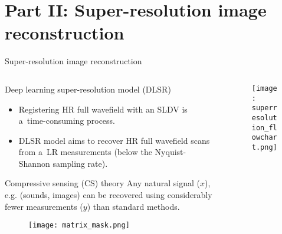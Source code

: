 \documentclass[10pt,aspectratio=169,dvipsnames]{beamer} %
\begin{document}
	\section{Part II: Super-resolution image reconstruction}
	\begin{frame}{Super-resolution image reconstruction}
		\begin{columns}[T]
			\begin{column}[t]{0.6\textwidth}
				\begin{alertblock}{Deep learning super-resolution model (DLSR)}					
					\begin{footnotesize}
						\justifying
						\addtolength{\leftmargini}{\labelsep}
						\begin{itemize}
							\item Registering HR full wavefield with an SLDV is a~time-consuming process.
							\item DLSR model aims to recover HR full wavefield scans from a~LR measurements (below the Nyquist-Shannon sampling rate).
						\end{itemize} 
					\end{footnotesize}					
				\end{alertblock}						
				\begin{exampleblock}{Compressive sensing (CS) theory}
					\footnotesize
					\justifying
					Any natural signal (\(x\)), e.g. (sounds, images) can be recovered using considerably fewer measurements (\(y\)) than standard methods.
					\vfill
					\begin{figure}[ht!]
						\centering
						\texttt{[image: matrix\_mask.png]}
					\end{figure}
				\end{exampleblock}							
			\end{column}
			\begin{column}[t]{0.4\textwidth}
				\begin{figure}[ht!]
					\centering
					\texttt{[image: superresolution\_flowchart.png]}
				\end{figure}
			\end{column}
		\end{columns}		
	\end{frame}
	\setcounter{subfigure}{0}
\end{document}
